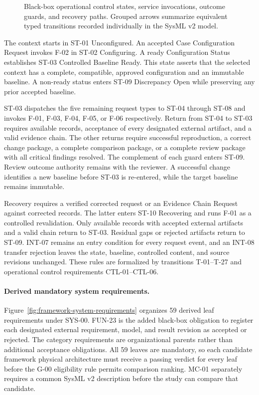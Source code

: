 \documentclass[11pt,a4paper]{article}
\begin{document}
\begin{figure}[H]
    \centering
    \resizebox{\linewidth}{!}{}
    \caption{Black-box operational control states, service invocations, outcome guards, and recovery paths. Grouped arrows summarize equivalent typed transitions recorded individually in the SysML v2 model.}
    \label{fig:framework-operational-state}
\end{figure}

The context starts in ST-01 Unconfigured. An accepted Case Configuration Request invokes F-02 in ST-02 Configuring. A ready Configuration Status establishes ST-03 Controlled Baseline Ready. This state asserts that the selected context has a complete, compatible, approved configuration and an immutable baseline. A non-ready status enters ST-09 Discrepancy Open while preserving any prior accepted baseline.

ST-03 dispatches the five remaining request types to ST-04 through ST-08 and invokes F-01, F-03, F-04, F-05, or F-06 respectively. Return from ST-04 to ST-03 requires available records, acceptance of every designated external artifact, and a valid evidence chain. The other returns require successful reproduction, a correct change package, a complete comparison package, or a complete review package with all critical findings resolved. The complement of each guard enters ST-09. Review outcome authority remains with the reviewer. A successful change identifies a new baseline before ST-03 is re-entered, while the target baseline remains immutable.

Recovery requires a verified corrected request or an Evidence Chain Request against corrected records. The latter enters ST-10 Recovering and runs F-01 as a controlled revalidation. Only available records with accepted external artifacts and a valid chain return to ST-03. Residual gaps or rejected artifacts return to ST-09. INT-07 remains an entry condition for every request event, and an INT-08 transfer rejection leaves the state, baseline, controlled content, and source revisions unchanged. These rules are formalized by transitions T-01--T-27 and operational control requirements CTL-01--CTL-06.

\paragraph{Derived mandatory system requirements.}
Figure~\ref{fig:framework-system-requirements} organizes 59 derived leaf requirements under SYS-00. FUN-23 is the added black-box obligation to register each designated external requirement, model, and result revision as accepted or rejected. The category requirements are organizational parents rather than additional acceptance obligations. All 59 leaves are mandatory, so each candidate framework physical architecture must receive a passing verdict for every leaf before the G-00 eligibility rule permits comparison ranking. MC-01 separately requires a common SysML v2 description before the study can compare that candidate.
\end{document}
